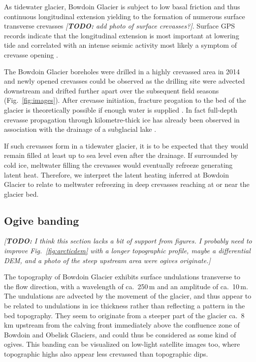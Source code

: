 \documentclass[utf8]{article}
\newcommand{\todo}[1]{\textcolor{c3}{\emph{[\textbf{TODO:} #1]}}}
\begin{document}
    As tidewater glacier, Bowdoin Glacier is subject to low basal friction and
    thus continuous longitudinal extension yielding to the formation of
    numerous surface transverse crevasses \todo{add photo of surface
    crevasses?}. Surface GPS records indicate that the longitudinal
    extension is most important at lowering tide and correlated with an intense
    seismic activity most likely a symptom of crevasse opening
    \citep{Podolskiy.etal.2016, Podolskiy.etal.2017}.

    The Bowdoin Glacier boreholes were drilled in a highly crevassed area in
    2014 and newly opened crevasses could be observed as the drilling site were
    advected downstream and drifted further apart over the subsequent field
    seasons (Fig.~\ref{fig:images}). After crevasse initiation, fracture
    progation to the bed of the glacier is theoretically possible if enough
    water is supplied \citep{Veen.2007}. In fact full-depth crevasse
    propagation through kilometre-thick ice has already been observed in
    association with the drainage of a subglacial lake \citep{Das.etal.2008}.

    If such crevasses form in a tidewater glacier, it is to be expected that
    they would remain filled at least up to sea level even after the drainage.
    If surrounded by cold ice, meltwater filling the crevasses would eventually
    refreeze generating latent heat. Therefore, we interpret the latent heating
    inferred at Bowdoin Glacier to relate to meltwater refreezing in deep
    crevasses reaching at or near the glacier bed.


\subsection{Ogive banding}

    \todo{I think this section lacks a bit of support from figures.
          I probably need to improve Fig.~\ref{fig:arcticdem} with a longer
          topographic profile, maybe a differential DEM, and a photo of the
          steep upstream area were ogives originate.}

    The topography of Bowdoin Glacier exhibits surface undulations transverse
    to the flow direction, with a wavelength of ca.~250\,m and an amplitude of
    ca.~10\,m. The undulations are advected by the movement of the glacier, and
    thus appear to be related to undulations in ice thickness rather than
    reflecting a pattern in the bed topography. They seem to originate from a
    steeper part of the glacier ca.~8\,km upstream from the calving front
    immediately above the confluence zone of Bowdoin and Obelisk Glaciers, and
    could thus be considered as some kind of ogives. This banding can be
    visualized on low-light satellite images too, where topographic highs also
    appear less crevassed than topographic dips.
\end{document}
